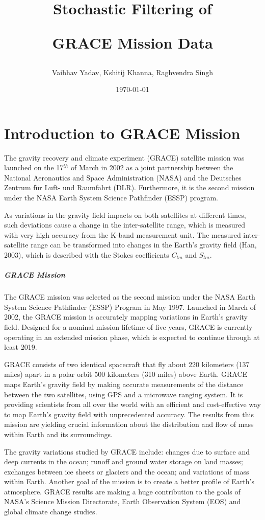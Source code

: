 \documentclass[a4paper,12pt]{report}
\title{\centerline{Stochastic Filtering of} \centerline{GRACE Mission Data}}
\author{Vaibhav Yadav, Kshitij Khanna, Raghvendra Singh}
\date{\today}
\begin{document}
\maketitle
\chapter{Introduction to GRACE Mission}
 The gravity recovery and climate experiment (GRACE) satellite mission was launched
on the 17$^{th}$ of March in 2002 as a joint partnership between the National Aeronautics
and Space Administration (NASA) and the Deutsches Zentrum für Luft- und Raumfahrt
(DLR). Furthermore, it is the second mission under the NASA Earth System Science
Pathfinder (ESSP) program.

As variations in the gravity field impacts on both satellites at different times, such
deviations cause a change in the inter-satellite range, which is measured with very high
accuracy from the K-band measurement unit. The measured inter-satellite range can
be transformed into changes in the Earth’s gravity field (Han, 2003), which is described
with the Stokes coefficients $C_{lm}$ and $S_{lm}$.


\paragraph{GRACE Mission} 
The GRACE mission was selected as the second mission under the NASA Earth System Science Pathfinder (ESSP) Program in May 1997. Launched in March of 2002, the GRACE mission is accurately mapping variations in Earth's gravity field. Designed for a nominal mission lifetime of five years, GRACE is currently operating in an extended mission phase, which is expected to continue through at least 2019.

GRACE consists of two identical spacecraft that fly about 220 kilometers (137 miles) apart in a polar orbit 500 kilometers (310 miles) above Earth. GRACE maps Earth's gravity field by making accurate measurements of the distance between the two satellites, using GPS and a microwave ranging system. It is providing scientists from all over the world with an efficient and cost-effective way to map Earth's gravity field with unprecedented accuracy. The results from this mission are yielding crucial information about the distribution and flow of mass within Earth and its surroundings.

The gravity variations studied by GRACE include: changes due to surface and deep currents in the ocean; runoff and ground water storage on land masses; exchanges between ice sheets or glaciers and the ocean; and variations of mass within Earth. Another goal of the mission is to create a better profile of Earth's atmosphere. GRACE results are making a huge contribution to the goals of NASA's Science Mission Directorate, Earth Observation System (EOS) and global climate change studies.
\end{document}
